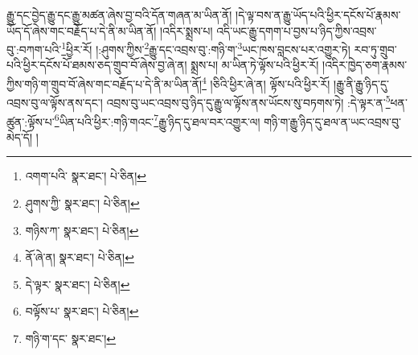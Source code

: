 རྒྱུ་དང་བྱེད་རྒྱུ་དང་རྒྱུ་མཚན་ཞེས་བྱ་བའི་དོན་གཞན་མ་ཡིན་ནོ། །དེ་ལྟ་བས་ན་རྒྱུ་ཡོད་པའི་ཕྱིར་དངོས་པོ་རྣམས་ཡོད་དོ་ཞེས་གང་བརྗོད་པ་དེ་ནི་མ་ཡིན་ནོ། །འདིར་སྨྲས་པ། འདི་ཡང་རྒྱུ་དགག་པ་བྱས་པ་ཉིད་ཀྱིས་འབྲས་བུ་:བཀག་པའི་\footnote{འགག་པའི་  སྣར་ཐང་།  པེ་ཅིན། }ཕྱིར་རོ། །:ཤུགས་ཀྱིས་\footnote{ཤུགས་ཀྱི་  སྣར་ཐང་།  པེ་ཅིན། }རྒྱུ་དང་འབྲས་བུ་:གཉི་ག་\footnote{གཉིས་ཀ་  སྣར་ཐང་།  པེ་ཅིན། }ཡང་ཁས་བླངས་པར་འགྱུར་ཏེ། རབ་ཏུ་གྲུབ་པའི་ཕྱིར་དངོས་པོ་ཐམས་ཅད་གྲུབ་བོ་ཞེས་བྱ་ཞེ་ན། སྨྲས་པ། མ་ཡིན་ཏེ་ལྟོས་པའི་ཕྱིར་རོ། །འདིར་ཁྱེད་ཅག་རྣམས་ཀྱིས་གཉི་ག་གྲུབ་བོ་ཞེས་གང་བརྗོད་པ་དེ་ནི་མ་ཡིན་ནོ།\footnote{ནོ་ཞེ་ན།  སྣར་ཐང་།  པེ་ཅིན། } །ཅིའི་ཕྱིར་ཞེ་ན། ལྟོས་པའི་ཕྱིར་རོ། །རྒྱུ་ནི་རྒྱུ་ཉིད་དུ་འབྲས་བུ་ལ་ལྟོས་ནས་དང་། འབྲས་བུ་ཡང་འབྲས་བུ་ཉིད་དུ་རྒྱུ་ལ་ལྟོས་ནས་ཡོངས་སུ་བཏགས་ཏེ། :དེ་ལྟར་ན་\footnote{དེ་ལྟར་  སྣར་ཐང་།  པེ་ཅིན། }ཕན་ཚུན་:ལྟོས་པ་\footnote{བལྟོས་པ་  སྣར་ཐང་།  པེ་ཅིན། }ཡིན་པའི་ཕྱིར་:གཉི་གའང་\footnote{གཉི་ག་དང་  སྣར་ཐང་། }རྒྱུ་ཉིད་དུ་ཐལ་བར་འགྱུར་ལ། གཉི་ག་རྒྱུ་ཉིད་དུ་ཐལ་ན་ཡང་འབྲས་བུ་མེད་དོ། །
